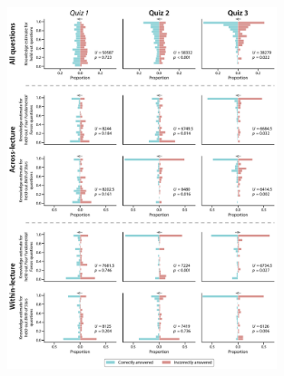 \documentclass[10pt]{article}
\providecommand{\DIFaddbeginFL}{} %
\providecommand{\DIFaddendFL}{} %
\providecommand{\DIFdelbeginFL}{} %
\providecommand{\DIFdelendFL}{} %
\newcommand{\DIFscaledelfig}{0.5}
\newlength{\DIFdelgraphicswidth} %
\newlength{\DIFdelgraphicsheight} %
\newcommand{\DIFaddincludegraphics}[2][]{{\color{blue}\fbox{\DIFOincludegraphics[#1]{#2}}}} %
\newcommand{\DIFdelincludegraphics}[2][]{%
\sbox{\DIFdelgraphicsbox}{\DIFOincludegraphics[#1]{#2}}%
\settoboxwidth{\DIFdelgraphicswidth}{\DIFdelgraphicsbox} %
\settoboxtotalheight{\DIFdelgraphicsheight}{\DIFdelgraphicsbox} %
\scalebox{\DIFscaledelfig}{%
\parbox[b]{\DIFdelgraphicswidth}{\usebox{\DIFdelgraphicsbox}\\[-\baselineskip] \rule{\DIFdelgraphicswidth}{0em}}\llap{\resizebox{\DIFdelgraphicswidth}{\DIFdelgraphicsheight}{%
\setlength{\unitlength}{\DIFdelgraphicswidth}%
\begin{picture}(1,1)%
\thicklines\linethickness{2pt} %
{\color[rgb]{1,0,0}\put(0,0){\framebox(1,1){}}}%
{\color[rgb]{1,0,0}\put(0,0){\line( 1,1){1}}}%
{\color[rgb]{1,0,0}\put(0,1){\line(1,-1){1}}}%
\end{picture}%
}\hspace*{3pt}}} %
} %
\DeclareRobustCommand{\DIFaddbeginFL}{\DIFOaddbeginFL \let\includegraphics\DIFaddincludegraphics} %
\DeclareRobustCommand{\DIFaddendFL}{\DIFOaddendFL \let\includegraphics\DIFOincludegraphics} %
\DeclareRobustCommand{\DIFdelbeginFL}{\DIFOdelbeginFL \let\includegraphics\DIFdelincludegraphics} %
\DeclareRobustCommand{\DIFdelendFL}{\DIFOaddendFL \let\includegraphics\DIFOincludegraphics} %
\begin{document}
\begin{figure}[tp]
    \centering
    \DIFdelbeginFL %
\DIFdelendFL \DIFaddbeginFL \includegraphics[width=0.7\textwidth]{figs/predict-knowledge-questions}
\DIFaddendFL 


\end{figure}
\end{document}
